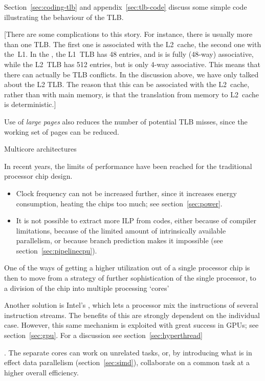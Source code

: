 Section~\ref{sec:coding-tlb} and appendix~\ref{sec:tlb-code} discuss
some simple code illustrating the
behaviour of the \ac{TLB}.

[There are some complications to this story. For instance, there is
  usually more than one \ac{TLB}. The first one is associated with the
  L2~cache, the second one with the~L1. In the
  , the L1~\ac{TLB} has 48 entries, and
  is is fully (48-way) associative, while the L2~\ac{TLB} has 512
  entries, but is only 4-way associative. This means that there can
  actually be \ac{TLB} conflicts. In the discussion above, we have
  only talked about the L2 \ac{TLB}. The reason that this can be
  associated with the L2~cache, rather than with main memory, is that
  the translation from memory to L2~cache is deterministic.]

Use of \emph{large pages} also reduces the
number of potential TLB misses, since the working set of pages can be
reduced.

 {Multicore architectures}
\label{sec:multicore}

In recent years, the limits of performance have been reached for the
traditional processor chip design.
\begin{itemize}
\item Clock frequency can not be increased further, since it increases
  energy consumption, heating the chips too
  much; see section~\ref{sec:power}. 
\item It is not possible to extract more \acf{ILP}
  from codes, either because of compiler limitations, because of the
  limited amount of intrinsically available parallelism, or because
  branch prediction makes it impossible (see
  section~\ref{sec:pipelinecpu}).
\end{itemize}

One of the ways of getting a higher utilization out of a single
processor chip is then to move from a strategy of further
sophistication of the single processor, to a division of the chip into
multiple processing `cores'
\begin{footnoteenv}
  {Another solution is Intel's
  , which lets a processor mix the instructions of
  several instruction streams. The benefits of this are strongly
  dependent on the individual case. However, this same mechanism is
  exploited with great success in GPUs; see
  section~\ref{sec:gpu}. For a discussion see
  section~\ref{sec:hyperthread}}
\end{footnoteenv}%
.
The separate cores can work on unrelated
tasks, or, by introducing what is in effect data parallelism
(section~\ref{sec:simd}), collaborate on a common task at a higher
overall efficiency\cite{Olukotun:1996:single-chip}.

